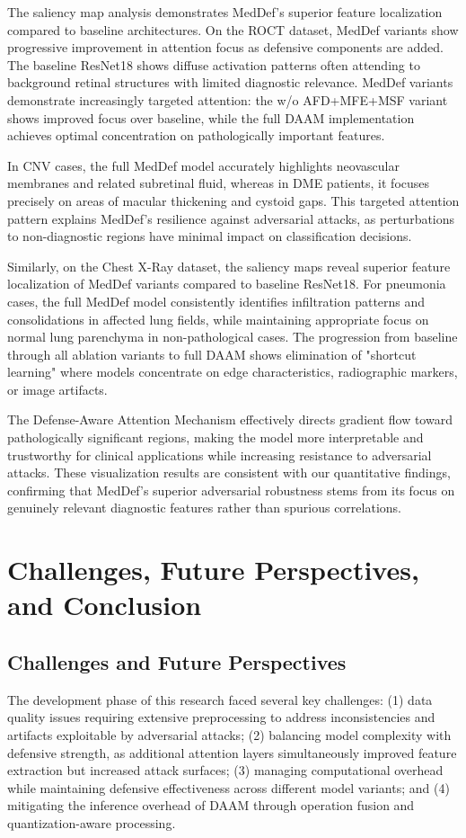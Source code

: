 \documentclass[preprint,12pt]{elsarticle}
\begin{document}
The saliency map analysis demonstrates MedDef's superior feature localization compared to baseline architectures. On the ROCT dataset, MedDef variants show progressive improvement in attention focus as defensive components are added. The baseline ResNet18 shows diffuse activation patterns often attending to background retinal structures with limited diagnostic relevance. MedDef variants demonstrate increasingly targeted attention: the w/o AFD+MFE+MSF variant shows improved focus over baseline, while the full DAAM implementation achieves optimal concentration on pathologically important features.

In CNV cases, the full MedDef model accurately highlights neovascular membranes and related subretinal fluid, whereas in DME patients, it focuses precisely on areas of macular thickening and cystoid gaps. This targeted attention pattern explains MedDef's resilience against adversarial attacks, as perturbations to non-diagnostic regions have minimal impact on classification decisions.

Similarly, on the Chest X-Ray dataset, the saliency maps reveal superior feature localization of MedDef variants compared to baseline ResNet18. For pneumonia cases, the full MedDef model consistently identifies infiltration patterns and consolidations in affected lung fields, while maintaining appropriate focus on normal lung parenchyma in non-pathological cases. The progression from baseline through all ablation variants to full DAAM shows elimination of "shortcut learning" where models concentrate on edge characteristics, radiographic markers, or image artifacts.

The Defense-Aware Attention Mechanism effectively directs gradient flow toward pathologically significant regions, making the model more interpretable and trustworthy for clinical applications while increasing resistance to adversarial attacks. These visualization results are consistent with our quantitative findings, confirming that MedDef's superior adversarial robustness stems from its focus on genuinely relevant diagnostic features rather than spurious correlations.

\section{Challenges, Future Perspectives, and Conclusion}
\label{sec:challenges}

\subsection{Challenges and Future Perspectives}
The development phase of this research faced several key challenges: (1) data quality issues requiring extensive preprocessing to address inconsistencies and artifacts exploitable by adversarial attacks; (2) balancing model complexity with defensive strength, as additional attention layers simultaneously improved feature extraction but increased attack surfaces; (3) managing computational overhead while maintaining defensive effectiveness across different model variants; and (4) mitigating the inference overhead of DAAM through operation fusion and quantization-aware processing.
\end{document}
